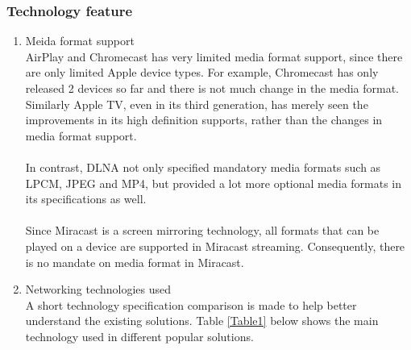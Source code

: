 \subsubsection{Technology feature} 
\begin{enumerate} 
\item Meida format support \\ 
AirPlay and Chromecast has very limited media format support, since there are 
only limited Apple device types. For example, Chromecast has only released 2 devices so far and there is not much change in the media format. Similarly Apple TV, even in its third generation,  has merely seen the improvements in its high definition supports, rather than the changes in media format support.  \\
\\
In contrast, DLNA not only specified mandatory media formats such as LPCM, JPEG  and MP4, but provided a lot more optional media formats in its specifications as well. \\
\\
Since Miracast is a screen mirroring technology, all formats that can be played on a device are supported in Miracast streaming. Consequently, there is no mandate on media format in Miracast.  

\item Networking technologies used \\ 

A short technology specification comparison is made to help better understand
the existing solutions. Table \ref{Table1} below shows the main technology used 
in different popular solutions. 
\begin{table}[htb] 
\caption{Technology used comparison\label{Table1}} 
\begin{center} 
\end{center} 
\end{table} 


\end{enumerate}
